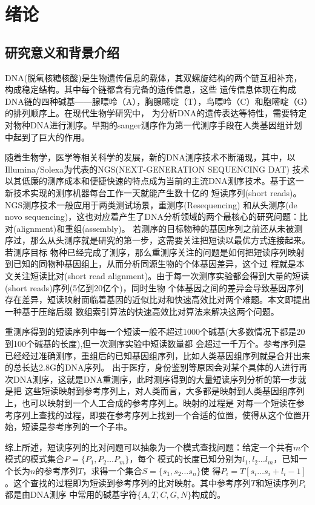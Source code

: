 
\chapter{绪论}
\label{chap:introduction}

\section{研究意义和背景介绍}

DNA(脱氧核糖核酸)是生物遗传信息的载体，其双螺旋结构的两个链互相补充，构成稳定结构。其中每个链都含有完备的遗传信息，这些
遗传信息体现在构成DNA链的四种碱基——腺嘌呤（A），胸腺嘧啶（T），鸟嘌呤（C）和胞嘧啶（G）的排列顺序上。在现代生物学研究中，
为分析DNA的遗传表达等特性，需要特定对物种DNA进行测序。早期的sanger测序作为第一代测序手段在人类基因组计划中起到了巨大的作用。

随着生物学，医学等相关科学的发展，新的DNA测序技术不断涌现，其中，以Illumina/Solexa为代表的NGS(NEXT-GENERATION SEQUENCING DAT)
技术以其低廉的测序成本和便捷快速的特点成为当前的主流DNA测序技术。基于这一新技术实现的测序机器每台工作一天就能产生数十亿的
短读序列(short reads)\cite{metzker2009sequencing}。NGS测序技术一般应用于两类测试场景，重测序(Resequencing)
和从头测序(de novo sequencing)，这也对应着产生了DNA分析领域的两个最核心的研究问题：比对(alignment)和重组(assembly)。
若测序的目标物种的基因序列之前还从未被测序过，那么从头测序就是研究的第一步，这需要关注把短读以最优方式连接起来。若测序目标
物种已经完成了测序，那么重测序关注的问题是如何把短读序列映射到已知的同物种基因组上，从而分析同源生物的个体基因差异，这个过
程就是本文关注短读比对(short read alignment)。由于每一次测序实验都会得到大量的短读(short reads)序列(5亿到20亿个)，同时生物
个体基因之间的差异会导致基因序列存在差异，短读映射面临着基因的近似比对和快速高效比对两个难题。本文即提出一种基于压缩后缀
数组索引算法的快速高效比对算法来解决这两个问题。

重测序得到的短读序列中每一个短读一般不超过1000个碱基(大多数情况下都是20到100个碱基的长度),但一次测序实验中短读数量都
会超过一千万个。参考序列是已经经过准确测序，重组后的已知基因组序列，比如人类基因组序列就是合并出来的总长达2.8G的DNA序列。
出于医疗，身份鉴别等原因会对某个具体的人进行再次DNA测序，这就是DNA重测序，此时测序得到的大量短读序列分析的第一步就是把
这些短读映射到参考序列上，对人类而言，大多都是映射到人类基因组序列上，也可以映射到一个人工合成的参考序列上。映射的过程是
对每一个短读在参考序列上查找的过程，即要在参考序列上找到一个合适的位置，使得从这个位置开始，短读是参考序列的一个子串。

综上所述，短读序列的比对问题可以抽象为一个模式查找问题：给定一个共有$m$个模式的模式集合$P=\{P_1,P_2\ldots P_m\}$，每个
模式的长度已知分别为$l_1,l_2\ldots l_m$，已知一个长为$n$的参考序列$T$，求得一个集合$S=\{s_1,s_2\ldots s_n\}$使
得$P_i=T[s_i\ldots s_i+l_i-1]$。这个查找的过程即为短读到参考序列的比对映射。其中参考序列$T$和短读序列$P_i$都是由DNA测序
中常用的碱基字符$\{A,T,C,G,N\}$构成的。

